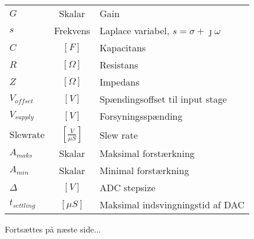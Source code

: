 \begin{table}[ht!]
\begin{threeparttable}
\begin{tabular}{l c p{}}
			$G$ & Skalar & Gain \\
			$s$ & Frekvens & Laplace variabel, $s = \sigma + \jmath \omega$ \\
			$C$ & $\left[\si{F}\right]$ & Kapacitans\\
			$R$ & $\left[\si{\Omega}\right]$ & Resistans\\
			$Z$ & $\left[\si{\Omega}\right]$ & Impedans\\
			$V_{offset}$ & $\left[\si{V}\right]$ & Spændingsoffset til input stage \\
			$V_{supply}$ & $\left[\si{V}\right]$ & Forsyningsspænding \\
			$\mathrm{Slew rate}$ & $\left[\si{\frac{V}{\mu S}}\right]$ & Slew rate \\
			$A_{maks}$ & Skalar & Maksimal forstærkning \\
			$A_{min}$ & Skalar & Minimal forstærkning\\
			$\Delta$ & $\left[\si{V}\right]$ & ADC stepsize\\
			$t_{settling}$ & $\left[\si{\mu S}\right]$ & Maksimal indsvingningstid af DAC\\
			
		
		\end{tabular}
	\begin{tablenotes}
		\item[] Fortsættes på næste side...
	\end{tablenotes}
	\end{threeparttable}
\end{table}

